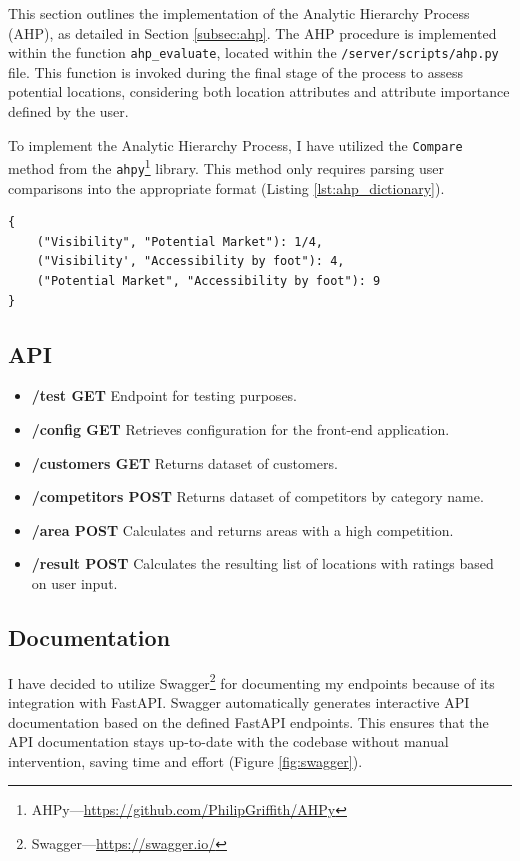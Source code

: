 This section outlines the implementation of the Analytic Hierarchy Process (AHP), as detailed in Section \ref{subsec:ahp}. The AHP procedure is implemented within the function \texttt{ahp\_evaluate}, located within the \texttt{/server/scripts/ahp.py} file. This function is invoked during the final stage of the process to assess potential locations, considering both location attributes and attribute importance defined by the user.

To implement the Analytic Hierarchy Process, I have utilized the \texttt{Compare} method from the \texttt{ahpy}\footnote{AHPy---\url{https://github.com/PhilipGriffith/AHPy}} library. This method only requires parsing user comparisons into the appropriate format (Listing \ref{lst:ahp_dictionary}).

\begin{lstlisting}[caption={Example dictionary representing pairwise comparisons in the AHP process.}, label=lst:ahp_dictionary]
{
    ("Visibility", "Potential Market"): 1/4, 
    ("Visibility', "Accessibility by foot"): 4, 
    ("Potential Market", "Accessibility by foot"): 9
}
\end{lstlisting}

\subsection{API}

\begin{itemize}
\item \textbf{/test GET} Endpoint for testing purposes.
\item \textbf{/config GET} Retrieves configuration for the front-end application.
\item \textbf{/customers GET} Returns dataset of customers.
\item \textbf{/competitors POST} Returns dataset of competitors by category name.
\item \textbf{/area POST} Calculates and returns areas with a high competition.
\item \textbf{/result POST} Calculates the resulting list of locations with ratings based on user input.
\end{itemize}

\subsection{Documentation}

I have decided to utilize Swagger\footnote{Swagger---\url{https://swagger.io/}} for documenting my endpoints because of its integration with FastAPI. Swagger automatically generates interactive API documentation based on the defined FastAPI endpoints. This ensures that the API documentation stays up-to-date with the codebase without manual intervention, saving time and effort (Figure \ref{fig:swagger}).

